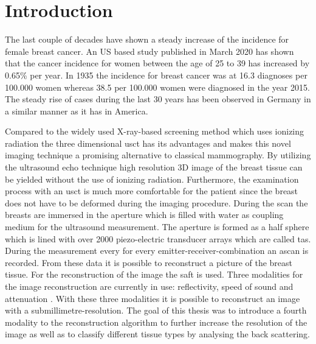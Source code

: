 \chapter{Introduction}
\label{chap:introduction}




The last couple of decades have shown a steady increase of the incidence for female breast cancer.
An US based study published in March 2020 \cite{Lima2020Trends2015} has shown that the cancer incidence for women between the age of 25 to 39 has increased by 0.65\% per year. In 1935 the incidence for breast cancer was at 16.3 diagnoses per 100.000 women whereas 38.5 per 100.000 women were diagnosed in the year 2015.
The steady rise of cases during the last 30 years has been observed in Germany in a similar manner as it has in America.

Compared to the widely used X-ray-based screening method which uses ionizing radiation the three dimensional \ac{usct} has its advantages and makes this novel imaging technique a promising alternative to classical mammography. By utilizing the ultrasound echo technique high resolution 3D image of the breast tissue can be yielded without the use of ionizing radiation. Furthermore, the examination process with an \ac{usct} is much more comfortable for the patient since the breast does not have to be deformed during the imaging procedure. 
During the scan the breasts are immersed in the aperture which is filled with water as coupling medium for the ultrasound measurement. The aperture is formed as a half sphere which is lined with over 2000 piezo-electric transducer arrays which are called \ac{tas}. During the measurement every for every emitter-receiver-combination an \ac{ascan} is recorded. 
From these data it is possible to reconstruct a picture of the breast tissue. For the reconstruction of the image the \ac{saft} is used.
Three modalities for the image reconstruction are currently in use: reflectivity, speed of sound and attenuation \cite{Jirik2012Sound-speedTomography}.
With these three modalities it is possible to reconstruct an image with a submillimetre-resolution.
The goal of this thesis was to introduce a fourth modality to the reconstruction algorithm to further increase the resolution of the image as well as to classify different tissue types by analysing the back scattering.  





\\

